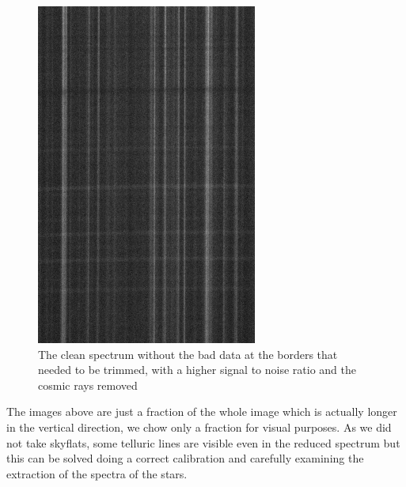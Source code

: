 \begin{figure}[H]
\begin{minipage}[b]{0.45\textwidth}
    \includegraphics[width=\textwidth]{images/cluster_clean.png}
    \caption[Clean spectrum of NGC5139]{The clean spectrum without the bad data at the borders that needed to be trimmed, with a higher signal to noise ratio and the cosmic rays removed}
  \end{minipage}
\end{figure}

The images above are just a fraction of the whole image which is actually longer in the vertical direction, we chow only a fraction for visual purposes. As we did not take skyflats, some telluric lines are visible even in the reduced spectrum but this can be solved doing a correct calibration and carefully examining the extraction of the spectra of the stars.

